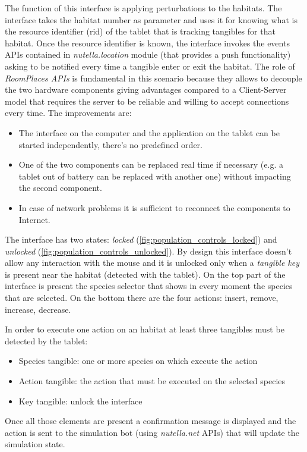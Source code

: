 The function of this interface is applying perturbations to the habitats. The interface takes the habitat number as parameter and uses it for knowing what is the resource identifier (rid) of the tablet that is tracking tangibles for that habitat. Once the resource identifier is known, the interface invokes the events APIs contained in \textit{nutella.location} module (that provides a push functionality) asking to be notified every time a tangible enter or exit the habitat. The role of \textit{RoomPlaces APIs} is fundamental in this scenario because they allows to decouple the two hardware components giving advantages compared to a Client-Server model that requires the server to be reliable and willing to accept connections every time. The improvements are:
\begin{itemize}
    \item The interface on the computer and the application on the tablet can be started independently, there's no predefined order.
    \item One of the two components can be replaced real time if necessary (e.g. a tablet out of battery can be replaced with another one) without impacting the second component.
    \item In case of network problems it is sufficient to reconnect the components to Internet.
\end{itemize}

The interface has two states: \textit{locked} (\ref{fig:population_controls_locked}) and \textit{unlocked} (\ref{fig:population_controls_unlocked}). By design this interface doesn't allow any interaction with the mouse and it is unlocked only when a \textit{tangible key} is present near the habitat (detected with the tablet). On the top part of the interface is present the species selector that shows in every moment the species that are selected. On the bottom there are the four actions: insert, remove, increase, decrease. 

In order to execute one action on an habitat at least three tangibles must be detected by the tablet:
\begin{itemize}
    \item Species tangible: one or more species on which execute the action
    \item Action tangible: the action that must be executed on the selected species
    \item Key tangible: unlock the interface
\end{itemize}
Once all those elements are present a confirmation message is displayed and the action is sent to the simulation bot (using \textit{nutella.net} APIs) that will update the simulation state.

